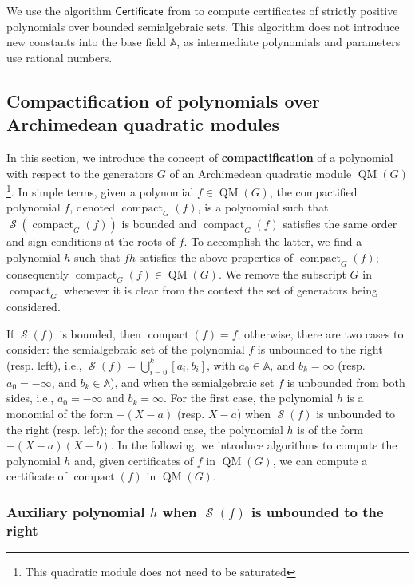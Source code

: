 \documentclass[preprint,12pt,authoryear]{elsarticle}
\DeclareMathOperator{\quadmod}{QM}
\DeclareMathOperator{\semialgebraic}{\mathcal{S}}
\DeclareMathOperator{\compact}{compact}
\DeclareMathOperator{\algPutinar}{\sf Certificate}
\begin{document}
We use the algorithm $\algPutinar$ from \cite{weifeng2025} to compute
certificates of strictly positive polynomials over bounded semialgebraic
sets. This algorithm does not introduce new constants into the base field
$\mathbb{A}$, as intermediate polynomials and parameters use rational
numbers.

 \subsection{Compactification of polynomials over Archimedean quadratic modules}
\label{compactification}

In this section, we introduce the concept of \textbf{compactification} of a
polynomial with respect to the generators $G$ of an Archimedean quadratic module
$\quadmod(G)$ \footnote{This quadratic module does not need to be saturated}. In
simple terms, given a polynomial $f \in \quadmod(G)$, the compactified
polynomial $f$, denoted $\compact_G(f)$, is a polynomial such that
$\semialgebraic(\compact_G(f))$ is bounded and $\compact_G(f)$ satisfies the
same order and sign conditions at the roots of $f$. To accomplish the latter, we
find a polynomial $h$ such that $f h$ satisfies the above properties of
$\compact_G(f)$; consequently $\compact_G(f) \in \quadmod(G)$. We remove the
subscript $G$ in $\compact_G$ whenever it is clear from the context the set of
generators being considered.

If $\semialgebraic(f)$ is bounded, then $\compact(f) = f$; otherwise, there are
two cases to consider: the semialgebraic set of the polynomial $f$ is unbounded
to the right (resp. left), i.e.,
$\semialgebraic(f) = \bigcup_{i=0}^{k}{[a_i, b_i]}$, with $a_0 \in \mathbb{A}$,
and $b_k = \infty$ (resp. $a_0 = -\infty$, and $b_k \in \mathbb{A}$), and when
the semialgebraic set $f$ is unbounded from both sides, i.e., $a_0 = -\infty$
and $b_k = \infty$. For the first case, the polynomial $h$ is a monomial of the
form $-(X - a)$ (resp. $X - a$) when $\semialgebraic(f)$ is unbounded to the
right (resp. left); for the second case, the polynomial $h$ is of the form
$-(X - a)(X - b)$. In the following, we introduce algorithms to compute the
polynomial $h$ and, given certificates of $f$ in $\quadmod(G)$, we can compute a
certificate of $\compact(f)$ in $\quadmod(G)$.

\subsubsection{Auxiliary polynomial $h$ when $\semialgebraic(f)$ is unbounded to
  the right}
\end{document}

